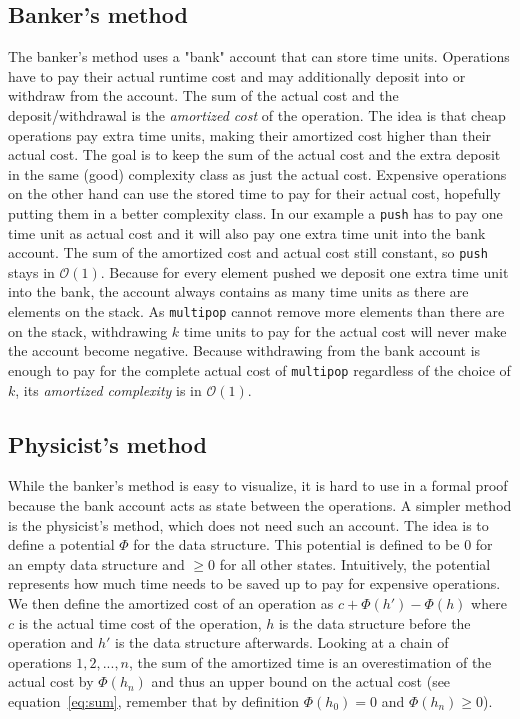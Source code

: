 \documentclass[sigplan,screen]{acmart}
\renewcommand\O[1]{$\mathcal{O}(#1)$}
\begin{document}
\subsection{Banker's method}\label{sec:banker}

The banker's method uses a "bank" account that can store time units. Operations have to pay their actual runtime cost and may additionally deposit into or withdraw from the account. The sum of the actual cost and the deposit/withdrawal is the \textit{amortized cost} of the operation. The idea is that cheap operations pay extra time units, making their amortized cost higher than their actual cost. The goal is to keep the sum of the actual cost and the extra deposit in the same (good) complexity class as just the actual cost. Expensive operations on the other hand can use the stored time to pay for their actual cost, hopefully putting them in a better complexity class. In our example a \texttt{push} has to pay one time unit as actual cost and it will also pay one extra time unit into the bank account. The sum of the amortized cost and actual cost still constant, so \texttt{push} stays in \O{1}. Because for every element pushed we deposit one extra time unit into the bank, the account always contains as many time units as there are elements on the stack. As \texttt{multipop} cannot remove more elements than there are on the stack, withdrawing $k$ time units to pay for the actual cost will never make the account become negative. Because withdrawing from the bank account is enough to pay for the complete actual cost of \texttt{multipop} regardless of the choice of $k$, its \textit{amortized complexity} is in \O{1}.

\subsection{Physicist's method}\label{sec:physicist}

While the banker's method is easy to visualize, it is hard to use in a formal proof because the bank account acts as state between the operations. A simpler method is the physicist's method, which does not need such an account. The idea is to define a potential $\Phi$ for the data structure. This potential is defined to be $0$ for an empty data structure and $\ge 0$ for all other states. Intuitively, the potential represents how much time needs to be saved up to pay for expensive operations. We then define the amortized cost of an operation as $c + \Phi(h') - \Phi(h)$ where $c$ is the actual time cost of the operation, $h$ is the data structure before the operation and $h'$ is the data structure afterwards. Looking at a chain of operations $1, 2, ..., n$, the sum of the amortized time is an overestimation of the actual cost by $\Phi(h_n)$ and thus an upper bound on the actual cost (see equation~\ref{eq:sum}, remember that by definition $\Phi(h_0) = 0$ and $\Phi(h_n) \ge 0$).
\end{document}
